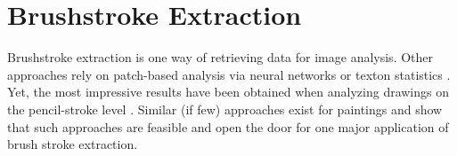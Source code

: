 











\section{Brushstroke Extraction}
Brushstroke extraction is one way of retrieving data for image analysis.
Other approaches rely on patch-based analysis via neural networks \cite{patchbased} or texton statistics \cite{textons}.
Yet, the most impressive results have been obtained when analyzing drawings on the pencil-stroke level \cite{picassomatissefake}.
Similar (if few) approaches exist for paintings and show that such approaches are feasible and open the door for one major application of brush stroke extraction.

